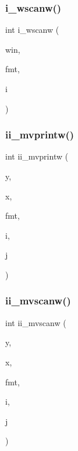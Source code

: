 \subsubsection{\texorpdfstring{i\+\_\+wscanw()}{i\_wscanw()}}
{\footnotesize\ttfamily int i\+\_\+wscanw (\begin{DoxyParamCaption}\item[{W\+I\+N\+D\+OW $\ast$}]{win,  }\item[{char $\ast$}]{fmt,  }\item[{int $\ast$}]{i }\end{DoxyParamCaption})}

\mbox{\label{C-macros_8c_ada22ee1895688f4926d3109021e89e33}} 
\subsubsection{\texorpdfstring{ii\+\_\+mvprintw()}{ii\_mvprintw()}}
{\footnotesize\ttfamily int ii\+\_\+mvprintw (\begin{DoxyParamCaption}\item[{int}]{y,  }\item[{int}]{x,  }\item[{const char $\ast$}]{fmt,  }\item[{int}]{i,  }\item[{int}]{j }\end{DoxyParamCaption})}

\mbox{\label{C-macros_8c_a620ec84aba8d1a5fadbba5724f1e01b8}} 
\subsubsection{\texorpdfstring{ii\+\_\+mvscanw()}{ii\_mvscanw()}}
{\footnotesize\ttfamily int ii\+\_\+mvscanw (\begin{DoxyParamCaption}\item[{int}]{y,  }\item[{int}]{x,  }\item[{char $\ast$}]{fmt,  }\item[{int $\ast$}]{i,  }\item[{int $\ast$}]{j }\end{DoxyParamCaption})}

